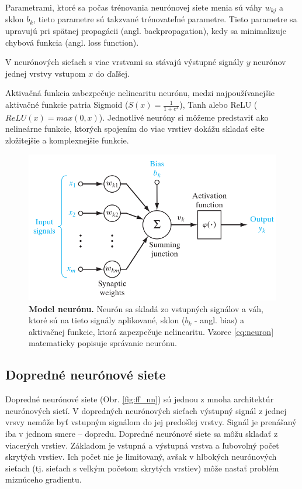 Parametrami, ktoré sa počas trénovania neurónovej siete menia sú váhy $w_{kj}$ a sklon $b_{k}$, tieto parametre sú takzvané trénovateľné parametre. Tieto parametre sa upravujú pri spätnej propagácii (angl. backpropagation), kedy sa minimalizuje chybová funkcia (angl. loss function).

V neurónových sieťach s viac vrstvami sa stávajú výstupné signály $y$ neurónov jednej vrstvy vstupom $x$ do ďaľšej.

Aktivačná funkcia zabezpečuje nelinearitu neurónu, medzi najpoužívanejšie aktivačné funkcie patria Sigmoid ($S(x) = \frac{1}{1 + e^x}$), Tanh alebo ReLU ($ReLU(x) = max(0, x)$). Jednotlivé neuróny si môžeme predstaviť ako nelineárne funkcie, ktorých spojením do viac vrstiev dokážu skladať ešte zložitejšie a komplexnejšie funkcie.

\begin{figure}[h!]
    \centering
    \includegraphics[scale=1]{assets/images/neuron.png}
    \caption{\textbf{Model neurónu.} \cite{haykin2009neural} Neurón sa skladá zo vstupných signálov a váh, ktoré sú na tieto signály aplikované, sklon ($b_k$ - angl. bias) a aktivačnej funkcie, ktorá zapezpečuje nelinearitu. Vzorec \ref{eq:neuron} matematicky popisuje správanie neurónu.} 
    \label{fig:neuron}
\end{figure}

\subsection{Dopredné neurónové siete}

Dopredné neurónové siete (Obr. \ref{fig:ff_nn}) sú jednou z mnoha architektúr neurónových sietí. V dopredných neurónových sieťach výstupný signál z jednej vrsvy nemôže byť vstupným signálom do jej predošlej vrstvy. Signál je prenášaný iba v jednom smere -- dopredu. Dopredné neurónové siete sa môžu skladať z viacerých vrstiev. Základom je vstupná a výstupná vrstva a ľubovolný počet skrytých vrstiev. Ich počet nie je limitovaný, avšak v hlbokých neurónových sieťach (tj. sieťach s veľkým početom skrytých vrstiev) môže nastať problém miznúceho gradientu.


